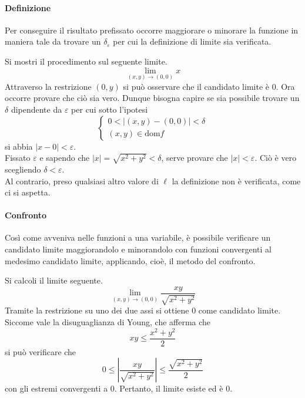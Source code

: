 \paragraph{Definizione}
Per conseguire il risultato prefissato occorre maggiorare o minorare la funzione in maniera tale da trovare un $\delta_\varepsilon$ per cui la definizione di limite sia verificata.
\begin{example}
    Si mostri il procedimento sul seguente limite.
    \begin{equation*}
        \lim_{(x,y) \to (0,0)}x
    \end{equation*}
    Attraverso la restrizione $(0,y)$ si può osservare che il candidato limite è $0$. Ora occorre provare che ciò sia vero.
    Dunque bisogna capire se sia possibile trovare un $\delta$ dipendente da $\varepsilon$ per cui sotto l'ipotesi
    \begin{equation*}
        \begin{cases}
            0<|(x,y)-(0,0)|<\delta\\
            (x,y) \in \text{dom}f
        \end{cases}
    \end{equation*}
    si abbia $|x-0|<\varepsilon$.\\
    Fissato $\varepsilon$ e sapendo che $|x|=\sqrt{x^2+y^2}<\delta$, serve provare che $|x|<\varepsilon$. Ciò è vero scegliendo $\delta<\varepsilon$.\\
    Al contrario, preso qualsiasi altro valore di $\ell$ la definizione non è verificata, come ci si aspetta.
\end{example}
\paragraph{Confronto}
Così come avveniva nelle funzioni a una variabile, è possibile verificare un candidato limite maggiorandolo e minorandolo con funzioni convergenti al medesimo candidato limite, applicando, cioè, il metodo del confronto.
\begin{example}
    Si calcoli il limite seguente.
    \begin{equation*}
        \lim_{(x,y) \to (0,0)}{\frac{xy}{\sqrt{x^2+y^2}}}
    \end{equation*}
    Tramite la restrizione su uno dei due assi si ottiene $0$ come candidato limite.
    Siccome vale la disuguaglianza di Young, che afferma che 
    \begin{equation*}
        xy \leq \frac{x^2+y^2}{2}
    \end{equation*}
    si può verificare che
    \begin{equation*}
        0 \leq \left|\frac{xy}{\sqrt{x^2+y^2}}\right| \leq \frac{\sqrt{x^2+y^2}}{2}
    \end{equation*}
    con gli estremi convergenti a $0$. Pertanto, il limite esiste ed è $0$.
\end{example}
